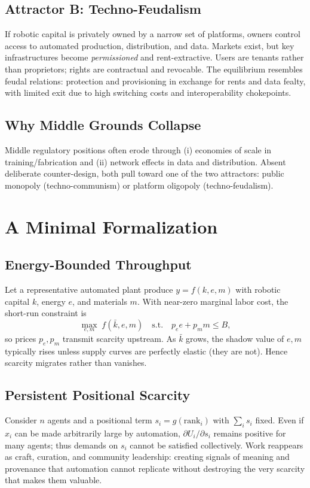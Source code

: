 \documentclass[12pt]{article}
\begin{document}
\subsection{Attractor B: Techno-Feudalism}
If robotic capital is privately owned by a narrow set of platforms, owners control access to automated production, distribution, and data. Markets exist, but key infrastructures become \emph{permissioned} and rent-extractive. Users are tenants rather than proprietors; rights are contractual and revocable. The equilibrium resembles feudal relations: protection and provisioning in exchange for rents and data fealty, with limited exit due to high switching costs and interoper\-ability chokepoints.

\subsection{Why Middle Grounds Collapse}
Middle regulatory positions often erode through (i) economies of scale in training/fabrication and (ii) network effects in data and distribution. Absent deliberate counter-design, both pull toward one of the two attractors: public monopoly (techno-communism) or platform oligopoly (techno-feudalism).

\section{A Minimal Formalization}
\subsection{Energy-Bounded Throughput}
Let a representative automated plant produce $y = f(k, e, m)$ with robotic capital $k$, energy $e$, and materials $m$. With near-zero marginal labor cost, the short-run constraint is
\[
\max_{e,m} \; f(\bar{k},e,m) \quad \text{s.t.} \quad p_e e + p_m m \leq B,
\]
so prices $p_e, p_m$ transmit scarcity upstream. As $\bar{k}$ grows, the shadow value of $e,m$ typically rises unless supply curves are perfectly elastic (they are not). Hence scarcity migrates rather than vanishes.

\subsection{Persistent Positional Scarcity}
Consider $n$ agents and a positional term $s_i = g(\text{rank}_i)$ with $\sum_i s_i$ fixed. Even if $x_i$ can be made arbitrarily large by automation, $\partial U_i / \partial s_i$ remains positive for many agents; thus demands on $s_i$ cannot be satisfied collectively. Work reappears as craft, curation, and community leadership: creating signals of meaning and provenance that automation cannot replicate without destroying the very scarcity that makes them valuable.
\end{document}
